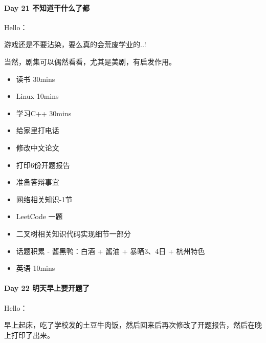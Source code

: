 \documentclass[UTF8,a4paper,8pt]{ctexbook}
\begin{document}
 	 \paragraph{Day 21   不知道干什么了都   \quad     }
	 	 Hello：
	 	 
	 	 游戏还是不要沾染，要么真的会荒废学业的..!
	 	 
	 	 当然，剧集可以偶然看看，尤其是美剧，有启发作用。
		 	 \begin{itemize}
		 	 	\item  \makebox[0pt][l]{$\square$}\raisebox{.15ex}{\hspace{0.1em}$\checkmark$}读书  30mins	
		 	 	\item  \makebox[0pt][l]{$\square$}\raisebox{.15ex}{\hspace{0.1em}$\checkmark$}Linux 10mins	  
		 	 	\item  学习C++ 30mins 
		 	 	\item  \makebox[0pt][l]{$\square$}\raisebox{.15ex}{\hspace{0.1em}$\checkmark$}给家里打电话
		 	 	\item  修改中文论文
		 	 	\item  \makebox[0pt][l]{$\square$}\raisebox{.15ex}{\hspace{0.1em}$\checkmark$}打印6份开题报告
		 	 	\item  \makebox[0pt][l]{$\square$}\raisebox{.15ex}{\hspace{0.1em}$\checkmark$}准备答辩事宜
		 	 	
		 	 	\item  网络相关知识-1节
		 	 	\item  LeetCode 一题
		 	 	\item  二叉树相关知识代码实现细节一部分
		 	 	
		 	 	\item  \makebox[0pt][l]{$\square$}\raisebox{.15ex}{\hspace{0.1em}$\checkmark$}话题积累 	- 酱黑鸭：白酒 + 酱油 + 暴晒3、4日 + 杭州特色
		 	 	\item  英语 10mins 	 
		 	 \end{itemize}
 	 \paragraph{Day 22  明天早上要开题了    \quad     }Hello：
 	 
		 早上起床，吃了学校发的土豆牛肉饭，然后回来后再次修改了开题报告，然后在晚上打印了出来。
		 
\end{document}
